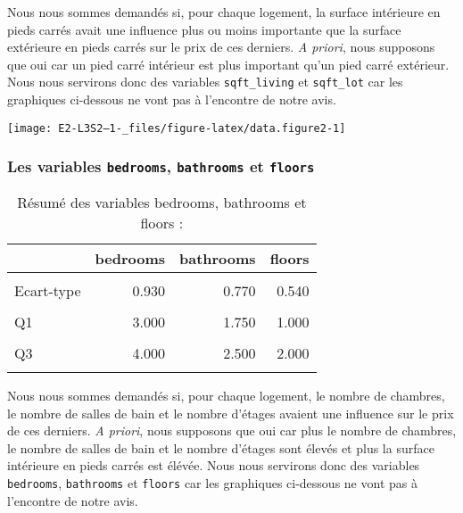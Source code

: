 \documentclass[
  11pt,
  french,
]{article}
\begin{document}
Nous nous sommes demandés si, pour chaque logement, la surface
intérieure en pieds carrés avait une influence plus ou moins importante
que la surface extérieure en pieds carrés sur le prix de ces derniers.
\textit{A priori}, nous supposons que oui car un pied carré intérieur
est plus important qu'un pied carré extérieur. Nous nous servirons donc
des variables \texttt{sqft\_living} et \texttt{sqft\_lot} car les
graphiques ci-dessous ne vont pas à l'encontre de notre avis.

\begin{center}\texttt{[image: E2-L3S2--1-\_files/figure-latex/data.figure2-1]} \end{center}

\newpage

\hypertarget{les-variables-bedrooms-bathrooms-et-floors}{%
\subsubsection{\texorpdfstring{Les variables \texttt{bedrooms},
\texttt{bathrooms} et
\texttt{floors}}{Les variables bedrooms, bathrooms et floors}}\label{les-variables-bedrooms-bathrooms-et-floors}}

\begin{table}[!h]

\caption{\label{tab:unnamed-chunk-3}Résumé des variables bedrooms, bathrooms et floors :}
\centering
\begin{tabular}[t]{lrrr}
\toprule
  & bedrooms & bathrooms & floors\\
\midrule
\cellcolor{gray!6}{Moyenne} & \cellcolor{gray!6}{3.371} & \cellcolor{gray!6}{2.115} & \cellcolor{gray!6}{1.494}\\
Ecart-type & 0.930 & 0.770 & 0.540\\
\cellcolor{gray!6}{Minimum} & \cellcolor{gray!6}{0.000} & \cellcolor{gray!6}{0.000} & \cellcolor{gray!6}{1.000}\\
Q1 & 3.000 & 1.750 & 1.000\\
\cellcolor{gray!6}{Q2} & \cellcolor{gray!6}{3.000} & \cellcolor{gray!6}{2.250} & \cellcolor{gray!6}{1.500}\\
\addlinespace
Q3 & 4.000 & 2.500 & 2.000\\
\cellcolor{gray!6}{Maximum} & \cellcolor{gray!6}{33.000} & \cellcolor{gray!6}{8.000} & \cellcolor{gray!6}{3.500}\\
\bottomrule
\end{tabular}
\end{table}

Nous nous sommes demandés si, pour chaque logement, le nombre de
chambres, le nombre de salles de bain et le nombre d'étages avaient une
influence sur le prix de ces derniers. \textit{A priori}, nous supposons
que oui car plus le nombre de chambres, le nombre de salles de bain et
le nombre d'étages sont élevés et plus la surface intérieure en pieds
carrés est élévée. Nous nous servirons donc des variables
\texttt{bedrooms}, \texttt{bathrooms} et \texttt{floors} car les
graphiques ci-dessous ne vont pas à l'encontre de notre avis.
\end{document}
